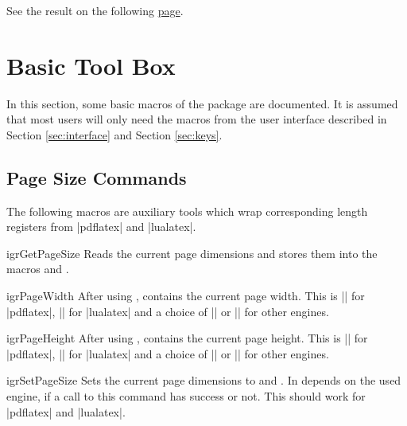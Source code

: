 \documentclass[a4paper,11pt]{ltxdoc}
\begin{document}
See the result on the following \hyperlink{mytarget}{page}.
\clearpage{}





\section{Basic Tool Box}\label{sec:basictoolbox}
In this section, some basic macros of the package are documented.
It is assumed that most users will only need the macros from the
user interface described in Section \ref{sec:interface} and Section \ref{sec:keys}.


\subsection{Page Size Commands}

The following macros are auxiliary tools which wrap corresponding length registers
from |pdflatex| and |lualatex|.

\begin{docCommand}[doc new=2021-10-12]{igrGetPageSize}{}
  Reads the current page dimensions and stores them into the macros
   and .
\end{docCommand}

\begin{docCommand}[doc new=2021-10-12]{igrPageWidth}{}
  After using ,  contains
  the current page width. This is |\pdfpagewidth| for |pdflatex|,
  |\pagewidth| for |lualatex| and a choice of |\pdfpagewidth| or |\paperwidth|
  for other engines.
\end{docCommand}

\begin{docCommand}[doc new=2021-10-12]{igrPageHeight}{}
  After using ,  contains
  the current page height. This is |\pdfpageheight| for |pdflatex|,
  |\pageheight| for |lualatex| and a choice of |\pdfpageheight| or |\paperheight|
  for other engines.
\end{docCommand}


\begin{docCommand}[doc new=2021-10-12]{igrSetPageSize}{}
  Sets the current page dimensions to  and .
  In depends on the used engine, if a call to this command has success or
  not. This should work for |pdflatex| and |lualatex|.
\end{docCommand}
\end{document}
